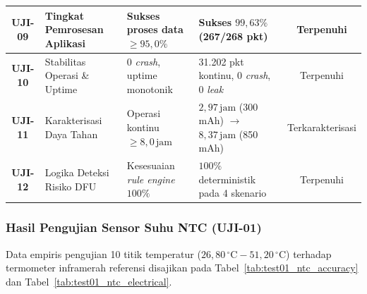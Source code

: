 \begin{table}[htbp]
{\begin{tabular}{|c|p{4.2cm}|p{3.8cm}|p{3.4cm}|c|}
\textbf{UJI-09} & Tingkat Pemrosesan Aplikasi & Sukses proses data $\ge 95{,}0\%$ & Sukses $99{,}63\%$ (267/268 pkt) & Terpenuhi \\ \hline
\textbf{UJI-10} & Stabilitas Operasi \& Uptime & 0 \textit{crash}, uptime monotonik & 31.202 pkt kontinu, 0 \textit{crash}, 0 \textit{leak} & Terpenuhi \\ \hline
\textbf{UJI-11} & Karakterisasi Daya Tahan & Operasi kontinu $\ge 8{,}0\,\mathrm{jam}$ & $2{,}97\,\mathrm{jam}$ (300 mAh) $\rightarrow$ $8{,}37\,\mathrm{jam}$ (850 mAh) & Terkarakterisasi \\ \hline
\textbf{UJI-12} & Logika Deteksi Risiko DFU & Kesesuaian \textit{rule engine} $100\%$ & $100\%$ deterministik pada 4 skenario & Terpenuhi \\ \hline
\end{tabular}%
}
\end{table}

\subsubsection{Hasil Pengujian Sensor Suhu NTC (UJI-01)}
Data empiris pengujian 10 titik temperatur ($26{,}80\,^\circ\mathrm{C} - 51{,}20\,^\circ\mathrm{C}$) terhadap termometer inframerah referensi disajikan pada Tabel~\ref{tab:test01_ntc_accuracy} dan Tabel~\ref{tab:test01_ntc_electrical}.


